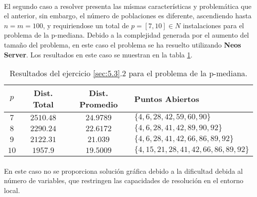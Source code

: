 \documentclass[spanish]{article}
\begin{document}
			\paragraph{}
			El segundo caso a resolver presenta las mísmas características y problemática que el anterior, sin embargo, el número de poblaciones es diferente, ascendiendo hasta $n = m = 100$, y requiriendose un total de $p = [7,10] \in N$ instalaciones para el problema de la p-mediana. Debido a la complejidad generada por el aumento del tamaño del problema, en este caso el problema se ha resuelto utilizando \textbf{Neos Server}\cite{tool:neos-server}. Los resultados en este caso se muestran en la tabla \ref{table:sol-5.3.2}.

			\begin{table}[H]
				\begin{center}
					\begin{tabular}{|c || c || c || l | }
						\hline
						$p$		& Dist. Total 	& Dist. Promedio	& Puntos Abiertos	 \\ \hline \hline
						$7$ 	& $2510.48$ 		& $24.9789$				& $\{4,6,28,42,59,60,90\}$ \\ \hline
						$8$ 	& $2290.24$ 		& $22.6172$				& $\{4,6,28,41,42,89,90,92\}$ \\ \hline
						$9$ 	& $2122.31$ 		& $21.039$				& $\{4,6,28,41,42,66,86,89,92\}$ \\ \hline
						$10$ 	& $1957.9$ 			& $19.5009$				& $\{4,15,21,28,41,42,66,86,89,92\}$ \\
						\hline
					\end{tabular}
				\end{center}
				\caption{Resultados del ejercicio \ref{sec:5.3}.2 para el problema de la p-mediana.}
				\label{table:sol-5.3.2}
			\end{table}

			\paragraph{}
			En este caso no se proporciona solución gráfica debido a la dificultad debida al número de variables, que restringen las capacidades de resolución en el entorno local.


	\nocite{subject:mio}
	\nocite{garciparedes:mosel-examples}
	
  
\end{document}
